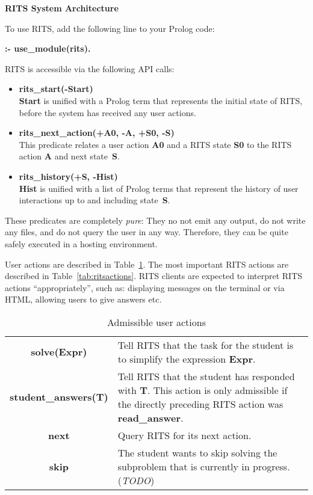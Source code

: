 \documentclass[a4paper,11pt]{article}
\begin{document}
\noindent
\begin{center}
\Large\textbf{RITS System Architecture}
\end{center}

\vspace{1cm}
\noindent
To use RITS, add the following line to your Prolog code:

\bigskip
\textbf{:- use\_module(rits).}
\bigskip

\noindent RITS is accessible via the following API calls:

\begin{itemize}
\item \textbf{rits\_start(-Start)}\\\textbf{Start} is unified with a
  Prolog term that represents the initial state of RITS, before the
  system has received any user actions.

\item \textbf{rits\_next\_action(+A0, -A, +S0, -S)}\\
  This predicate relates a user action \textbf{A0} and a RITS state
  \textbf{S0} to the RITS action \textbf{A} and next state~\textbf{S}.

\item \textbf{rits\_history(+S, -Hist)}\\
  \textbf{Hist} is unified with a list of Prolog terms that represent
  the history of user interactions up to and including state~\textbf{S}.
\end{itemize}

These predicates are completely \textit{pure}: They no not emit any
output, do not write any files, and do not query the user in any way.
Therefore, they can be quite safely executed in a hosting environment.

User actions are described in Table~\ref{tab:useractions}. The most
important RITS actions are described in Table~\ref{tab:ritsactions}.
RITS clients are expected to interpret RITS actions ``appropriately'',
such as: displaying messages on the terminal or via HTML, allowing
users to give answers etc.

\begin{table}[ht]
  \centering
  \begin{tabular}{cp{7cm}}
    \hline
    \textbf{solve(Expr)} & Tell RITS that the task for the student is to simplify  the expression \textbf{Expr}.\\
    \textbf{student\_answers(T)} & Tell RITS that the student has responded with \textbf{T}. This action is only admissible if the directly preceding RITS action was \textbf{read\_answer}.\\
    \textbf{next} & Query RITS for its next action. \\
    \textbf{skip} & The student wants to skip solving the subproblem that is
    currently in progress. (\textit{TODO})\\
    \hline
  \end{tabular}
\caption{Admissible user actions}
  \label{tab:useractions}
\end{table}
\end{document}
